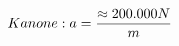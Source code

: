 \documentclass[preview]{standalone}
\begin{document}
\begin{align*}
\special{dvisvgm:raw <g id='unique000'>}Kanone: a = \frac{\approx 200.000 N}{m}\special{dvisvgm:raw </g>}
\end{align*}
\end{document}
